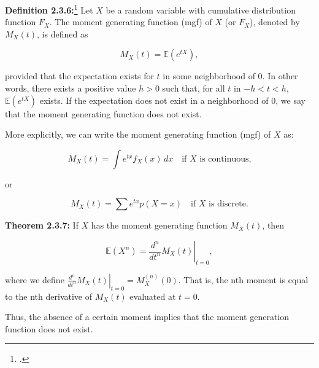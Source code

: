 \documentclass[UTF8,a4paper,10pt]{article}
\begin{document}
\begin{mybox}{}

  \textbf{Definition 2.3.6:}\footcite[][62]{Casella2002}
    Let \(X\) be a random variable with cumulative distribution function \(F_X\). The moment generating function (mgf) of \(X\) (or \(F_X\)), denoted by \(M_X(t)\), is defined as
    
    \[
    M_X(t) = \mathbb{E}(e^{tX}),
    \]
    
    provided that the expectation exists for \(t\) in some neighborhood of 0. In other words, there exists a positive value \(h > 0\) such that, for all \(t\) in \(-h < t < h\), \(\mathbb{E}(e^{tX})\) exists. If the expectation does not exist in a neighborhood of 0, we say that the moment generating function does not exist.

    More explicitly, we can write the moment generating function (mgf) of \(X\) as:

\[
M_X(t) = \int e^{tx} f_X(x) \, dx \quad \text{if } X \text{ is continuous,}
\]

or

\[
M_X(t) = \sum e^{tx} p(X = x) \quad \text{if } X \text{ is discrete.}
\]

    \dotfill

    \textbf{Theorem 2.3.7:}
      If \(X\) has the moment generating function \(M_X(t)\), then
      
      \[
      \mathbb{E}(X^n) = \left. \frac{d^n}{dt^n} M_X(t) \right|_{t=0},
      \]
      
      where we define \(\left. \frac{d^n}{dt^n} M_X(t) \right|_{t=0} = M^{(n)}_X(0)\). That is, the nth moment is equal to the nth derivative of \(M_X(t)\) evaluated at \(t = 0\).
      

\end{mybox}

Thus, the absence of a certain moment implies that the moment generation function does not exist. 
\end{document}
